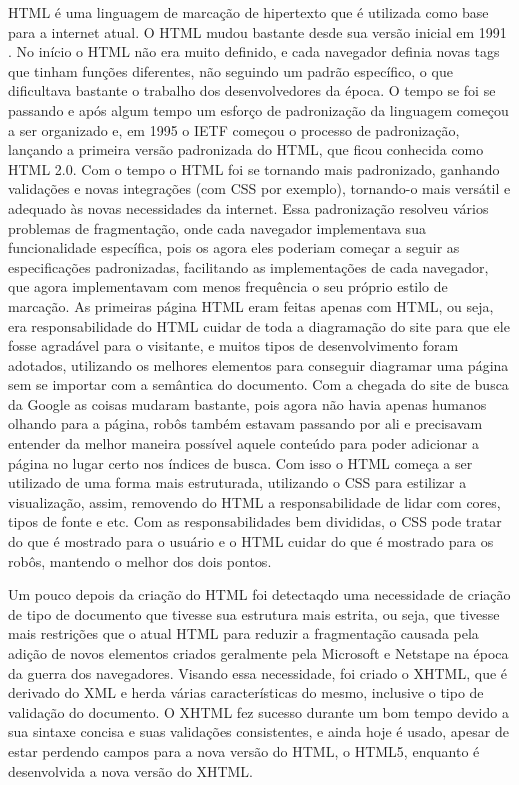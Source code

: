 HTML é uma linguagem de marcação de hipertexto que é utilizada como base para a internet
atual. O HTML mudou bastante desde sua versão inicial em 1991 \cite{powell2003html}.
No início o HTML não era muito definido, e cada
navegador definia novas tags que tinham funções diferentes,
não seguindo um padrão específico, o que dificultava
bastante o trabalho dos desenvolvedores da época.
O tempo se foi se passando e após algum tempo um esforço de padronização da linguagem
começou a ser organizado e, em 1995 o IETF começou o processo de
padronização, lançando a primeira versão padronizada do HTML, que ficou conhecida como HTML 2.0.
Com o tempo o HTML foi se tornando mais padronizado, ganhando validações e novas integrações
(com CSS por exemplo), tornando-o mais versátil e adequado às novas necessidades da
internet.
Essa padronização resolveu vários problemas de fragmentação, onde cada
navegador implementava sua funcionalidade específica, pois os agora
eles poderiam começar a seguir as especificações padronizadas,
facilitando as implementações de cada navegador, que agora implementavam com
menos frequência o seu próprio estilo de marcação.
As primeiras página HTML eram feitas apenas com HTML, ou seja, era
responsabilidade do HTML cuidar de toda a diagramação do site para que
ele fosse agradável para o visitante, e muitos tipos de
desenvolvimento foram adotados, utilizando os melhores elementos para
conseguir diagramar uma página sem se importar com a semântica do
documento. Com a chegada do site de busca da Google as coisas mudaram bastante, pois
agora não havia apenas humanos olhando para a página, robôs também
estavam passando por ali e precisavam entender da melhor maneira
possível aquele conteúdo para poder adicionar a página no lugar certo
nos índices de busca. Com isso o HTML começa a ser utilizado de uma
forma mais estruturada, utilizando o CSS para estilizar a visualização,
assim, removendo do HTML a responsabilidade de lidar com cores, tipos de
fonte e etc. Com as responsabilidades bem divididas, o CSS pode tratar
do que é mostrado para o usuário e o HTML cuidar do que é mostrado
para os robôs, mantendo o melhor dos dois pontos.

Um pouco depois da criação do HTML foi detectaqdo uma necessidade de
criação de tipo de documento que tivesse sua estrutura mais estrita,
ou seja, que tivesse mais restrições que o atual HTML para reduzir a
fragmentação causada pela adição de novos elementos criados geralmente
pela Microsoft e Netstape na época da guerra dos navegadores. Visando
essa necessidade, foi criado o XHTML, que é derivado do XML e herda
várias características do mesmo, inclusive o tipo de validação do documento.
O XHTML fez sucesso durante um bom tempo devido a sua sintaxe concisa e
suas validações consistentes, e ainda hoje é usado, apesar de estar
perdendo campos para a nova versão do HTML, o HTML5, enquanto é
desenvolvida a nova versão do XHTML.

